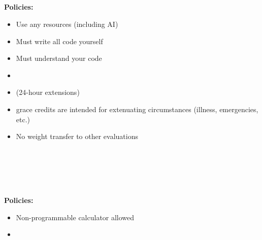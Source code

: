 \documentclass[mathserif, handout]{beamer}
\begin{document}
\begin{frame}
\begin{center}
\Large {}\\
  \\
 \\
 \\
\end{center}
\vspace{0.5cm}


\textbf{Policies:}
\begin{itemize}
    \item Use any resources (including AI)
    \item Must write all code yourself
    \item Must understand your code
    \item {}
    \item {} (24-hour extensions)
    \item grace credits are intended for extenuating circumstances (illness, emergencies, etc.)
    \item No weight transfer to other evaluations
\end{itemize}

\end{frame}

\begin{frame}
\begin{center}
\Large {}\\
  \\
 \\
 \\
\end{center}
\vspace{0.5cm}

\textbf{Policies:}
\begin{itemize}
    \item Non-programmable calculator allowed
    \item {}
\end{itemize}

\end{frame}
\end{document}
